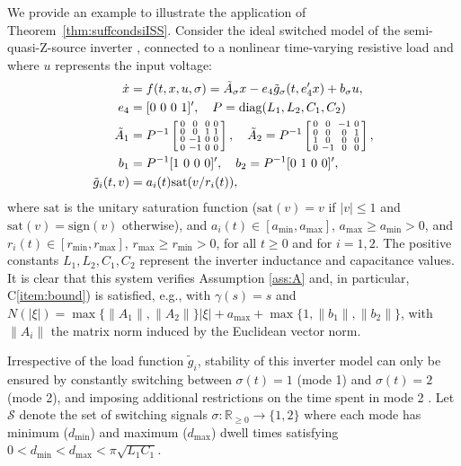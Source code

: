 \documentclass[9pt,final,journal]{IEEEtran}
\newtheorem{example}{Example}
\def\R{\mathbb{R}}
\def\S{\mathcal{S}}
\def\sat{\mathrm{sat}}
\def\sign{\mathrm{sign}}
\def\diag{\mathrm{diag}}
\begin{document}
We provide an example to illustrate the application of Theorem~\ref{thm:suffcondsiISS}.
  Consider the ideal switched model of the semi-quasi-Z-source inverter \cite{caojia_tpe11,haimid_cdc13}, connected to a nonlinear time-varying resistive load and where $u$ represents the input voltage:
  \begin{align}
  \label{eq:ex1}  \dot x &= f(t,x,u,\sigma) = \tilde A_{\sigma} x - e_4 \tilde g_{\sigma}(t,e_4'x) + b_{\sigma} u,\\
    e_4 &= [0\ 0\ 0\ 1]',\quad
    P = \diag(L_1,L_2,C_1,C_2)\notag\\
    \tilde A_1 &= P^{-1}\left[
      \begin{smallmatrix}
        0 & 0 & 0 & 0\\
        0 & 0 & 1 & 1\\
        0 & -1 & 0 & 0\\
        0 & -1 & 0 & 0
      \end{smallmatrix}\right],\quad
    \tilde A_2 = P^{-1}\left[
      \begin{smallmatrix}
        0 & 0 & -1 & 0\\
        0 & 0 &  0 & 1\\
        1 & 0 &  0 & 0\\
        0 & -1 & 0 & 0
      \end{smallmatrix}\right],\notag\\
    b_1 &= P^{-1} [1\ 0\ 0\ 0]',\quad b_2 = P^{-1} [0\ 1\ 0\ 0]',\notag\\
    \label{eq:load}
    \tilde g_i(t,v) &= a_i(t)\sat(v/r_i(t)),
  \end{align}
  where $\sat$ is the unitary saturation function ($\sat(v) = v$ if $|v| \le 1$ and $\sat(v) = \sign(v)$ otherwise), and $a_i(t) \in [a_{\min},a_{\max}]$, $a_{\max} \ge a_{\min} > 0$, and $r_i(t) \in [r_{\min},r_{\max}]$, $r_{\max}\ge r_{\min} > 0$, 
  for all $t\ge 0$ and for $i=1,2$. The positive constants $L_1,L_2,C_1,C_2$ represent the inverter 
  inductance and capacitance values. It is clear that this system verifies Assumption \ref{ass:A} and, in particular, C\ref{item:bound}) is satisfied, e.g., with $\gamma(s)=s$ and $N(|\xi|) = \max\{\|A_1\|,\|A_2\|\} |\xi| + a_{\max} + \max\{1,\|b_1\|,\|b_2\|\}$, with $\|A_i\|$ the matrix norm induced by the Euclidean vector norm. 
  
  Irrespective of the load function $\tilde g_i$, stability of this inverter model 
  can only be ensured by constantly switching between $\sigma(t)=1$ (mode 1) and $\sigma(t) = 2$ (mode 2), and imposing additional restrictions on the time spent 
  in mode 2 \cite{denhai_auto16}. Let $\S$ denote the set of switching signals $\sigma : \R_{\ge 0} \to \{1,2\}$ where 
  each mode has minimum ($d_{\min}$) and maximum ($d_{\max}$) dwell times satisfying 
  $0 < d_{\min} < d_{\max} < \pi \sqrt{L_1C_1}$. 
  
\end{document}
